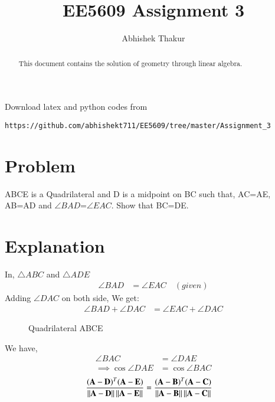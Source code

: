 \documentclass[journal,12pt,twocolumn]{IEEEtran}
\begin{document}
     \def\rightbox#1{\makebox[0in][r]{#1}}
     \def\centbox#1{\makebox[0in]{#1}}
     \def\topbox#1{\raisebox{-\baselineskip}[0in][0in]{#1}}
     \def\midbox#1{\raisebox{-0.5\baselineskip}[0in][0in]{#1}}
\vspace{3cm}
\title{EE5609 Assignment 3}
\author{Abhishek Thakur}
\maketitle
\newpage
\bigskip
\renewcommand{\thefigure}{\theenumi}
\renewcommand{\thetable}{\theenumi}
\begin{abstract}
This document contains the solution of geometry through linear algebra.
\end{abstract}
Download latex and python codes from 
\begin{lstlisting}
https://github.com/abhishekt711/EE5609/tree/master/Assignment_3
\end{lstlisting}
%
\section{Problem}
ABCE is a Quadrilateral and D is a midpoint on BC such that, AC=AE, AB=AD and $\angle BAD$=$\angle EAC$. Show that BC=DE.
\section{Explanation}
In, $\triangle{ABC}$ and $\triangle{ADE}$
\begin{align} 
\angle BAD &= \angle EAC \quad (given) \label{eq1}
\end{align}
Adding $\angle DAC$ on both side, We get:
\begin{align}
 \angle BAD + \angle DAC &= \angle EAC + \angle DAC \label{eqn_2} 
\end{align}

\begin{figure}[!htb]
	\centering
    \centering
\resizebox{\columnwidth}{!}{}
	\caption{Quadrilateral ABCE}
\end{figure}
We have,
\begin{align}
 \angle BAC &= \angle DAE \label{eq3}\\
 \implies \cos\angle DAE  &=  \cos\angle BAC \label{eq4}
\end{align}
\begin{align}
 \frac{(\mathbf A -\mathbf D)^T(\mathbf{A}-\mathbf{E})} {\left\lVert\mathbf{A}-\mathbf{D}\right\rVert \left\lVert\mathbf{A}-\mathbf{E}\right\rVert } 
 &= \frac{(\mathbf A -\mathbf B)^T(\mathbf{A}-\mathbf{C})} {\left\lVert\mathbf{A}-\mathbf{B}\right\rVert \left\lVert\mathbf{A}-\mathbf{C}\right\rVert}\label{eq7}
 \end{align}
\end{document}
